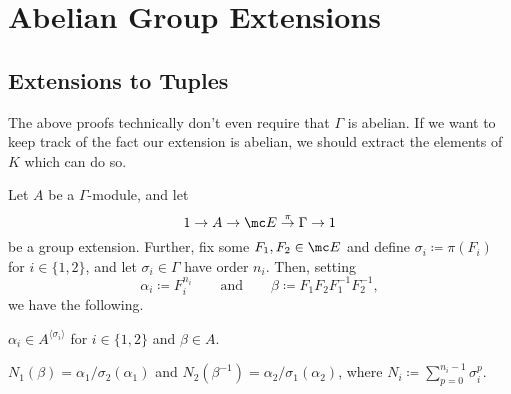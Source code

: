 \documentclass{article}
\numberwithin{equation}{section}
\begin{document}
\section{Abelian Group Extensions}

\subsection{Extensions to Tuples}
The above proofs technically don't even require that $\Gamma$ is abelian. If we want to keep track of the fact our extension is abelian, we should extract the elements of $K$ which can do so.
\begin{lemma} \label{lem:constructalphabeta}
	Let $A$ be a $\Gamma$-module, and let 
	\[1\to A\to\mc E\stackrel\pi\to\Gamma\to1\]
	be a group extension. Further, fix some $F_1,F_2\in\mc E$ and define $\sigma_i\coloneqq\pi(F_i)$ for $i\in\{1,2\}$, and let $\sigma_i\in\Gamma$ have order $n_i$. Then, setting
	\[\alpha_i\coloneqq F_i^{n_i}\qquad\text{and}\qquad\beta\coloneqq F_1F_2F_1^{-1}F_2^{-1},\]
	we have the following.
	\begin{listalph}
		\item $\alpha_i\in A^{\langle\sigma_i\rangle}$ for $i\in\{1,2\}$ and $\beta\in A$.
		\item $N_1(\beta)=\alpha_1/\sigma_2(\alpha_1)$ and $N_2(\beta^{-1})=\alpha_2/\sigma_1(\alpha_2)$, where $N_i\coloneqq\sum_{p=0}^{n_i-1}\sigma_i^p$.
	\end{listalph}
\end{lemma}
\end{document}

